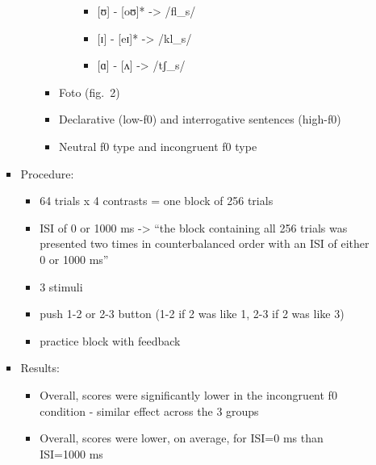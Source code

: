 \documentclass[
]{article}
\providecommand{\tightlist}{%
  \setlength{\itemsep}{0pt}\setlength{\parskip}{0pt}}
\begin{document}
\begin{itemize}
\begin{itemize}
\begin{itemize}
\begin{itemize}
\begin{itemize}
\begin{itemize}
            \begin{itemize}
            \tightlist
            \item
              {[}ʊ{]} - {[}oʊ{]}* -\textgreater{} /fl\_s/
            \item
              {[}ɪ{]} - {[}eɪ{]}* -\textgreater{} /kl\_s/
            \item
              {[}ɑ{]} - {[}ʌ{]} -\textgreater{} /tʃ\_s/
            \end{itemize}
          \end{itemize}
        \item
          Foto (fig.~2)
        \item
          Declarative (low-f0) and interrogative sentences (high-f0)
        \item
          Neutral f0 type and incongruent f0 type
        \end{itemize}
      \end{itemize}
    \item
      Procedure:

      \begin{itemize}
      \tightlist
      \item
        64 trials x 4 contrasts = one block of 256 trials
      \item
        ISI of 0 or 1000 ms -\textgreater{} ``the block containing all
        256 trials was presented two times in counterbalanced order with
        an ISI of either 0 or 1000 ms''
      \item
        3 stimuli
      \item
        push 1-2 or 2-3 button (1-2 if 2 was like 1, 2-3 if 2 was like
        3)
      \item
        practice block with feedback
      \end{itemize}
    \item
      Results:

      \begin{itemize}
      \tightlist
      \item
        Overall, scores were significantly lower in the incongruent f0
        condition - similar effect across the 3 groups
      \item
        Overall, scores were lower, on average, for ISI=0 ms than
        ISI=1000 ms


\end{itemize}
\end{itemize}
\end{itemize}
\end{itemize}
\end{document}
